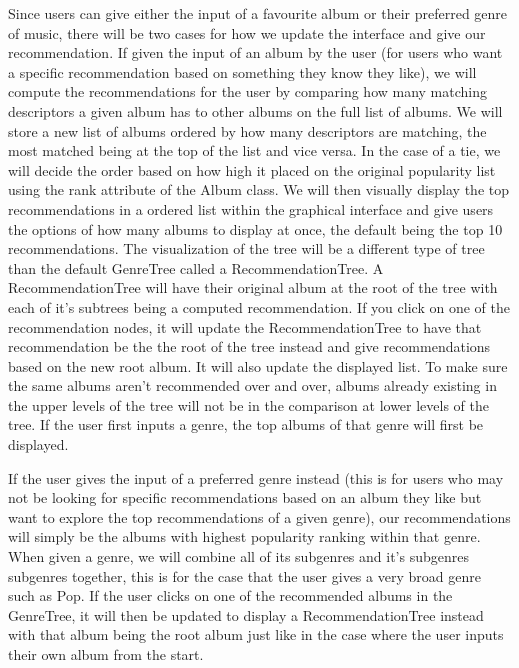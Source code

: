 \documentclass[fontsize=11pt]{article}
\begin{document}
Since users can give either the input of a favourite album or their preferred genre of music, there will be two cases for how we update the interface and give our recommendation.
If given the input of an album by the user (for users who want a specific recommendation based on something they know they like), we will compute the recommendations for the user by comparing how many matching descriptors a given album has to other albums on the full list of albums. We will store a new list of albums ordered by how many descriptors are matching, the most matched being at the top of the list and vice versa. In the case of a tie, we will decide the order based on how high it placed on the original popularity list using the rank attribute of the Album class. We will then visually display the top recommendations in a ordered list within the graphical interface and give users the options of how many albums to display at once, the default being the top 10 recommendations. The visualization of the tree will be a different type of tree than the default GenreTree called a RecommendationTree. A RecommendationTree will have their original album at the root of the tree with each of it's subtrees being a computed recommendation. If you click on one of the recommendation nodes, it will update the RecommendationTree to have that recommendation be the the root of the tree instead and give recommendations based on the new root album. It will also update the displayed list. To make sure the same albums aren't recommended over and over, albums already existing in the upper levels of the tree will not be in the comparison at lower levels of the tree. If the user first inputs a genre, the top albums of that genre will first be displayed.  \newline

If the user gives the input of a preferred genre instead (this is for users who may not be looking for specific recommendations based on an album they like but want to explore the top recommendations of a given genre), our recommendations will simply be the albums with highest popularity ranking within that genre. When given a genre, we will combine all of its subgenres and it's subgenres subgenres together, this is for the case that the user gives a very broad genre such as Pop. If the user clicks on one of the recommended albums in the GenreTree, it will then be updated to display a RecommendationTree instead with that album being the root album just like in the case where the user inputs their own album from the start. \newline
\end{document}
